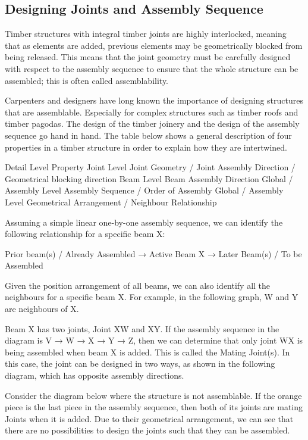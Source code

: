 \subsection{Designing Joints and Assembly Sequence}
Timber structures with integral timber joints are highly interlocked, meaning that as elements are added, previous elements may be geometrically blocked from being released. This means that the joint geometry must be carefully designed with respect to the assembly sequence to ensure that the whole structure can be assembled; this is often called assemblability. 

Carpenters and designers have long known the importance of designing structures that are assemblable. Especially for complex structures such as timber roofs and timber pagodas. The design of the timber joinery and the design of the assembly sequence go hand in hand. The table below shows a general description of four properties in a timber structure in order to explain how they are intertwined.

Detail Level
Property
Joint Level
Joint Geometry / Joint Assembly Direction / Geometrical blocking direction 
Beam Level
Beam Assembly Direction
Global / Assembly Level
Assembly Sequence / Order of Assembly
Global / Assembly Level
Geometrical Arrangement / Neighbour Relationship


Assuming a simple linear one-by-one assembly sequence, we can identify the following relationship for a specific beam X:

Prior beam(s) / Already Assembled → Active Beam X → Later Beam(s) / To be Assembled

Given the position arrangement of all beams, we can also identify all the neighbours for a specific beam X. For example, in the following graph, W and Y are neighbours of X.

Beam X has two joints, Joint XW and XY. If the assembly sequence in the diagram is V → W → X → Y → Z, then we can determine that only joint WX is being assembled when beam X is added. This is called the Mating Joint(s). In this case, the joint can be designed in two ways, as shown in the following diagram, which has opposite assembly directions.

Consider the diagram below where the structure is not assemblable. If the orange piece is the last piece in the assembly sequence, then both of its joints are mating Joints when it is added. Due to their geometrical arrangement, we can see that there are no possibilities to design the joints such that they can be assembled. 

